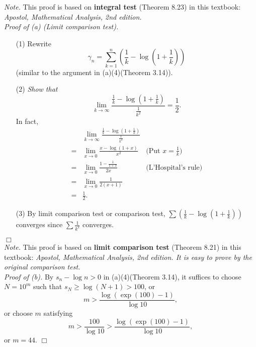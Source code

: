 \documentclass{article}
\begin{document}
\emph{Note.}
This proof is based on \textbf{integral test} (Theorem 8.23) in this textbook:
\emph{Apostol, Mathematical Analysis, 2nd edition.} \\



\emph{Proof of (a) (Limit comparison test).}
\begin{enumerate}
\item[(1)]
Rewrite
\[
  \gamma_n
  = \sum_{k=1}^{n} \left( \frac{1}{k} - \log \left(1+\frac{1}{k}\right) \right)
\]
(similar to the argument in (a)(4)(Theorem 3.14)).
\item[(2)]
\emph{Show that
\[
  \lim_{k \to \infty}
  \frac{\frac{1}{k} - \log \left(1+\frac{1}{k}\right)}{ \frac{1}{k^2} }
  = \frac{1}{2}.
\]}
In fact,
\begin{align*}
  &\lim_{k \to \infty}
  \frac{\frac{1}{k} - \log \left(1+\frac{1}{k}\right)}{ \frac{1}{k^2} } \\
  =&
  \lim_{x \to 0} \frac{x - \log(1+x)}{ x^2 }
    &\text{(Put $x = \frac{1}{k}$)} \\
  =&
  \lim_{x \to 0} \frac{1 - \frac{1}{1+x}}{ 2x }
    &\text{(L'Hospital's rule)} \\
  =&
  \lim_{x \to 0} \frac{1}{ 2(x+1) } \\
  =& \frac{1}{2}.
\end{align*}
\item[(3)]
By limit comparison test or comparison test,
$\sum \left( \frac{1}{k} - \log \left(1+\frac{1}{k}\right) \right)$
converges since $\sum \frac{1}{k^2}$ converges.
\end{enumerate}
$\Box$ \\

\emph{Note.}
This proof is based on \textbf{limit comparison test} (Theorem 8.21) in this textbook:
\emph{Apostol, Mathematical Analysis, 2nd edition.
It is easy to prove by the original comparison test.} \\



\emph{Proof of (b).}
By $s_n - \log n > 0$ in (a)(4)(Theorem 3.14),
it suffices to choose $N = 10^m$ such that
$s_N \geq \log(N+1) > 100$, or
\[
  m > \frac{\log(\exp(100) - 1)}{\log 10},
\]
or choose $m$ satisfying
\[
  m
  > \frac{100}{\log 10}
  > \frac{\log(\exp(100) - 1)}{\log 10},
\]
or $m = 44$.
$\Box$ \\\\



\end{document}
